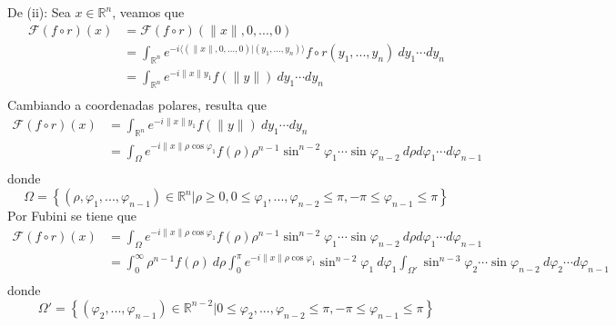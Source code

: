 \documentclass[12pt]{report}
\newcounter{it}
\theoremstyle{largebreak}
\renewcommand{\leq}{\ensuremath{\leqslant}}
\renewcommand{\geq}{\ensuremath{\geqslant}}
\newcommand\norm[1]{\ensuremath{\|#1\|}}
\newcommand\pint[2]{\ensuremath{\langle#1| #2\rangle}}
\newcommand{\fou}[1]{\ensuremath{\mathcal{F}#1}}
\begin{document}
\begin{sol}
        De (ii): Sea $x\in\mathbb{R}^n$, veamos que
        \begin{equation*}
            \begin{split}
                \fou{(f\circ r)}(x)&=\fou{(f\circ r)}(\norm{x},0,...,0)\\
                &=\int_{\mathbb{R}^n}e^{-i\pint{(\norm{x},0,...,0)}{(y_1,...,y_n)}}f\circ r(y_1,...,y_n)\:dy_1\cdots dy_n\\
                &=\int_{\mathbb{R}^n}e^{ -i\norm{x}y_1}f(\norm{y})\:dy_1\cdots dy_n\\
            \end{split}
        \end{equation*}
        Cambiando a coordenadas polares, resulta que
        \begin{equation*}
            \begin{split}
                \fou{(f\circ r)}(x)&=\int_{\mathbb{R}^n}e^{ -i\norm{x}y_1}f(\norm{y})\:dy_1\cdots dy_n\\
                &=\int_{\Omega}e^{ -i\norm{x}\rho\cos\varphi_1}f(\rho)\rho^{ n-1}\sin^{ n-2}\varphi_1\cdots\sin\varphi_{ n-2} \: d\rho d\varphi_1\cdots d\varphi_{ n-1}\\
            \end{split}
        \end{equation*}
        donde
        \begin{equation*}
            \Omega=\left\{(\rho,\varphi_1,...,\varphi_{ n-1})\in\mathbb{R}^n\Big|\rho\geq0,0\leq\varphi_1,...,\varphi_{ n-2}\leq\pi,-\pi\leq\varphi_{ n-1}\leq\pi \right\}
        \end{equation*}
        Por Fubini se tiene que
        \begin{equation*}
            \begin{split}
                \fou{(f\circ r)}(x)&=\int_{\Omega}e^{ -i\norm{x}\rho\cos\varphi_1}f(\rho)\rho^{ n-1}\sin^{ n-2}\varphi_1\cdots\sin\varphi_{ n-2} \: d\rho d\varphi_1\cdots d\varphi_{ n-1}\\
                &=\int_{0}^\infty \rho^{ n-1}f(\rho)\:d\rho \int_{0}^\pi e^{ -i\norm{x}\rho\cos\varphi_1}\sin^{ n-2}\varphi_1\:d\varphi_1 \int_{\Omega'} \sin^{ n-3}\varphi_2\cdots\sin\varphi_{ n-2} \: d\varphi_{2}\cdots d\varphi_{ n-1}\\
            \end{split}
        \end{equation*}
        donde
        \begin{equation*}
            \Omega'=\left\{(\varphi_2,...,\varphi_{ n-1})\in\mathbb{R}^{n-2}\Big|0\leq\varphi_2,...,\varphi_{ n-2}\leq\pi,-\pi\leq\varphi_{ n-1}\leq\pi \right\}

\end{equation*}
\end{sol}
\end{document}
